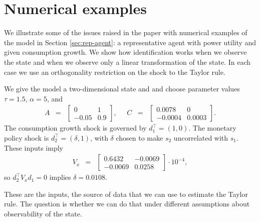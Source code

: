 \documentclass[12pt]{article}
\begin{document}
{\section{Numerical examples}
\label{app:examples}

We illustrate some of the issues raised in the paper with numerical examples
of the model in Section \ref{sec:rep-agent}:
a representative agent with power utility and given consumption growth.
We show how identification works when
we observe the state
and when we observe only a linear transformation of the state.
In each case we use an orthogonality restriction
on the shock to the Taylor rule.

We give the model a two-dimensional state and
and choose parameter values
$\tau=1.5$, $\alpha=5$, and
\begin{eqnarray*}
    A &=&
        \left[
        \begin{array}{rr}
        0 & 1 \\ -0.05 & 0.9
        \end{array}
        \right],
        \;\;\;\;\;
    C \;\;=\;\;
        \left[
        \begin{array}{rr}
        0.0078 & 0 \\ -0.0004 & 0.0003
        \end{array}
        \right] .
\end{eqnarray*}
The consumption growth shock is governed by $ d_1^\top = (1, 0)$.
The monetary policy shock is $ d_2^\top = (\delta, 1)$,
with $\delta$ chosen to make $s_2$ uncorrelated with $s_1$.
These inputs imply
\begin{eqnarray*}
    V_x &=&
       \left[
        \begin{array}{rr}
        0.6432 & -0.0069 \\ -0.0069 & 0.0258
        \end{array}
        \right] \cdot 10^{-4} ,
\end{eqnarray*}
so $ d_2^\top V_x d_1 = 0 $ implies $\delta = 0.0108$.

These are the inputs, the source of data that we can use
to estimate the Taylor rule.
The question is whether we can do that under different
assumptions about observability of the state.

}
\end{document}
